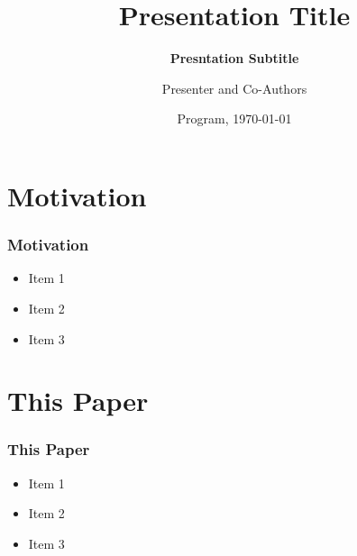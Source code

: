 \documentclass[11pt]{beamer}
\begin{document}
	\title[Presentation Title]{\bfseries Presentation Title}
	\subtitle{\bfseries Presntation Subtitle}
	\author[Full Name]{Presenter and Co-Authors}

	
	\date[\today]{Program, \today}

	\begin{frame}[plain]
		\maketitle
		
	\end{frame}
	\setcounter{framenumber}{0}

\section{Motivation}
	\begin{frame}
		\frametitle{\bfseries Motivation}
		
		\begin{itemize}
			\item Item 1
			\item Item 2
			\item Item 3
		\end{itemize}
	\end{frame}

\section[]{This Paper}
	\begin{frame}
		\frametitle{\bfseries This Paper}
		
		\begin{itemize}
			\item Item 1
			\item Item 2
			\item Item 3
		\end{itemize}

	\end{frame}
\end{document}
